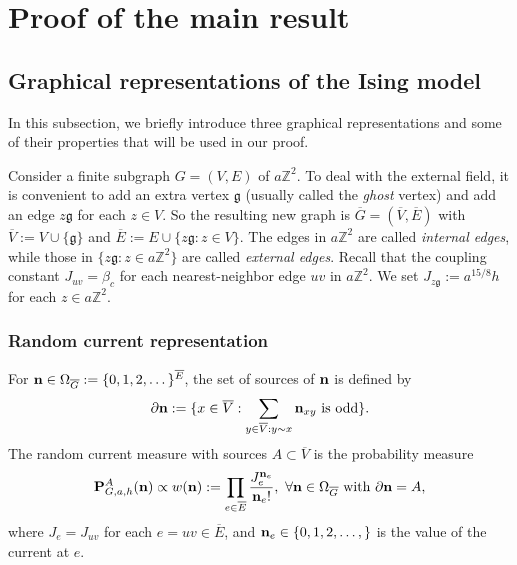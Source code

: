 \documentclass[article,12pt,reqno]{amsart}
\begin{document}


\section{Proof of the main result}
\subsection{Graphical representations of the Ising model}
In this subsection, we briefly introduce three graphical representations and some of their properties that will be used in our proof.

Consider a finite subgraph $G=(V,E)$ of $a\mathbb{Z}^2$. To deal with the external field, it is convenient to add an extra vertex $\mathfrak{g}$ (usually called the {\it ghost} vertex) and add an edge $z\mathfrak{g}$ for each $z\in V$. So the resulting new graph is $\overline{G}=(\overline{V}, \overline{E})$ with $\overline{V}:=V\cup\{\mathfrak{g}\}$ and $\overline{E}:=E\cup \{z\mathfrak{g}: z\in V\}$. The edges in $a\mathbb{Z}^2$ are called {\it internal edges}, while those in $\{z\mathfrak{g}: z\in a\mathbb{Z}^2\}$ are called {\it external edges}.
Recall that the coupling constant $J_{uv}=\beta_c$ for each nearest-neighbor edge $uv$ in $a\mathbb{Z}^2$. We set $J_{z\mathfrak{g}}:=a^{15/8}h$ for each $z\in a\mathbb{Z}^2$. 
\subsubsection*{Random current representation}
For ${\bf n}\in \Omega_{\overline{G}}:=\{0,1,2,\dots\}^{\overline{E}}$, the set of sources of ${\bf n}$ is defined by
\[\partial {\bf n}:=\{x\in \overline{V}: \sum_{y \in \overline{V}: y \sim x} {\bf n}_{xy} \text{ is odd}\}.\]
The random current measure with sources $A\subset \overline{V}$ is the probability measure
\[\mathbf{P}^A_{G,a,h}({\bf n}) \propto w({\bf n}):=\prod_{e \in \overline{E}} \frac{J_e^{{\bf n}_{e}}}{{\bf n}_e !},~ \forall {\bf n}\in \Omega_{\overline{G}} \text{ with }\partial {\bf n} =A,\]
where $J_e=J_{uv}$ for each $e=uv \in \overline{E}$, and ${\bf n}_e \in \{0,1,2,\dots,\}$ is the value of the current at $e$.
\end{document}
